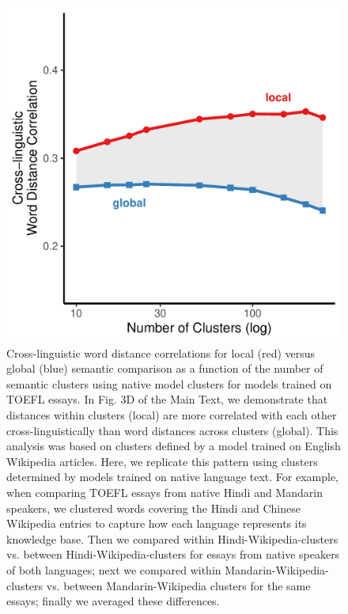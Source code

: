 \documentclass[9pt,twoside,lineno]{pnas-new}
\begin{document}
\begin{figure}[h]
\centering
     \includegraphics[width = 5in]{suppfigs/native_clustering_local_global}
         \caption{Cross-linguistic word distance correlations for local (red) versus global (blue) semantic comparison as a function of the number of semantic clusters using native model clusters for models trained on TOEFL essays. In Fig. 3D of the Main Text, we demonstrate that distances within clusters (local) are more correlated with each other cross-linguistically than word distances across clusters (global). This analysis was based on clusters defined by a model trained on English Wikipedia articles. Here, we replicate this pattern using clusters determined by models trained on native language text. For example, when comparing TOEFL essays from native Hindi and Mandarin speakers, we clustered words covering the Hindi and Chinese Wikipedia entries to capture how each language represents its knowledge base. Then we compared within Hindi-Wikipedia-clusters vs. between Hindi-Wikipedia-clusters for essays from native speakers of both languages; next we compared within Mandarin-Wikipedia-clusters vs. between Mandarin-Wikipedia clusters for the same essays; finally we averaged these differences. }
\end{figure}
\end{document}
